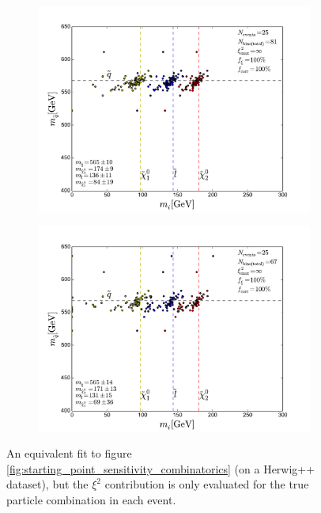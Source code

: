 \documentclass[twoside,english]{uiofysmaster}
\begin{document}
\begin{figure}[hbt]
	\begin{subfigure}[b]{0.45\textwidth}
		\includegraphics[width=\textwidth]{figures/improving_combinatorics/herwigpp-momcons_nocomb_800-500-300-50.pdf} 
		\caption{ }
	\end{subfigure}
	\begin{subfigure}[b]{0.45\textwidth}
		\includegraphics[width=\textwidth]{figures/improving_combinatorics/herwigpp-momcons_nocomb_1000-100-80-30.pdf}
		\caption{ } 
	\end{subfigure}
	\caption{An equivalent fit to figure \ref{fig:starting_point_sensitivity_combinatorics} (on a {\ttfamily Herwig++} dataset), but the $\xi^2$ contribution is only evaluated for the true particle combination in each event.}
	\label{fig:moving_on-starting_point_sensitivity_no_combinatorics}
\end{figure}
\end{document}
